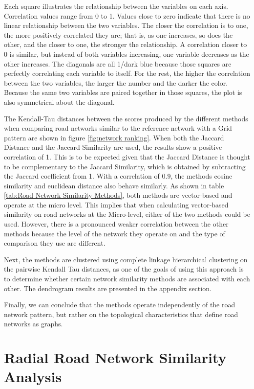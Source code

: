 Each square illustrates the relationship between the variables on each axis. Correlation values range from 0 to 1. Values close to zero indicate that there is no linear relationship between the two variables. The closer the correlation is to one, the more positively correlated they are; that is, as one increases, so does the other, and the closer to one, the stronger the relationship. A correlation closer to 0 is similar, but instead of both variables increasing, one variable decreases as the other increases. The diagonals are all 1/dark blue because those squares are perfectly correlating each variable to itself. For the rest, the higher the correlation between the two variables, the larger the number and the darker the color. Because the same two variables are paired together in those squares, the plot is also symmetrical about the diagonal.

The Kendall-Tau distances between the scores produced by the different methods when comparing road networks similar to the reference network with a Grid pattern are shown in figure \ref{fig:network ranking}. When both the Jaccard Distance and the Jaccard Similarity are used, the results show a positive correlation of 1. This is to be expected given that the Jaccard Distance is thought to be complementary to the Jaccard Similarity, which is obtained by subtracting the Jaccard coefficient from 1. With a correlation of 0.9, the methods cosine similarity and euclidean distance also behave similarly. As shown in table \ref{tab:Road Network Similarity Methods}, both methods are vector-based and operate at the micro level. This implies that when calculating vector-based similarity on road networks at the Micro-level, either of the two methods could be used. However, there is a pronounced weaker correlation between the other methods because the level of the network they operate on and the type of comparison they use are different.

Next, the methods are clustered using complete linkage hierarchical clustering on the pairwise Kendall Tau distances, as one of the goals of using this approach is to determine whether certain network similarity methods are associated with each other. The dendrogram results are presented in the appendix section.

Finally, we can conclude that the methods operate independently of the road network pattern, but rather on the topological characteristics that define road networks as graphs.


\section{Radial Road Network Similarity Analysis}

